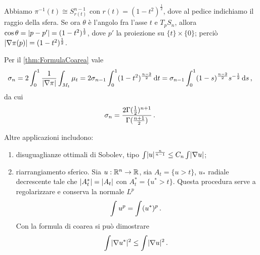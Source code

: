 Abbiamo $\pi^{-1}(t) \cong S^{n-1}_{r(t)}$ con $r(t) = (1-t^2)^{\frac 12}$, dove al pedice indichiamo il raggio della sfera.
Se ora $\theta$ è l'angolo fra l'asse $t$ e $T_pS_n$, allora $\cos\theta = \lvert p-p'\rvert = (1-t^2)^{\frac 12}$, dove $p'$ la proiezione su $\{t\}\times \{0\}$; perciò $\lvert\nabla \pi(p)\rvert = (1-t^2)^{\frac 12}$.

Per il \cref{thm:FormulaCoarea} vale
\begin{equation*}
	\sigma_n = 2\int_0^1 \frac 1{\lvert\nabla \pi\rvert} \int_{M_t} \mu_t = 2\sigma_{n-1} \int_0^1 (1-t^2)^{\frac{n-2}{2}} \,\mathrm d t = \sigma_{n-1} \int_0^1 (1-s)^{\frac{n-2}{2}} s^{-\frac 12} \,\mathrm d s \, \text{, }
\end{equation*}
da cui 
\begin{equation*}
	\sigma_n = \frac{2\Gamma(\frac 12)^{n+1}}{\Gamma(\frac{n+1}2)} \, \text{. }
\end{equation*}

Altre applicazioni includono:
\begin{enumerate}
	\item disuguaglianze ottimali di Sobolev, tipo $\int \lvert u\rvert^{\frac n{n-1}} \le C_n \int \lvert\nabla u\rvert$;
	
	\item riarrangiamento sferico. Sia $u:\mathbb R^n\to \mathbb R$, sia $A_t = \{ u> t \}$, $u_*$ radiale decrescente tale che $\lvert A_t^*\rvert = \lvert A_t\rvert$ con $A_t^* = \{u^*>t\}$. Questa procedura serve a regolarizzare e conserva la normale $L^p$
	\begin{equation*}
		\int u^p = \int (u^*)^p \, \text{. }
	\end{equation*}
	Con la formula di coarea si può dimostrare
	\begin{equation*}
		\int \lvert\nabla u^*\rvert^2 \le \int \lvert\nabla u\rvert^2 \, \text{. }
	\end{equation*}
	
\end{enumerate}







